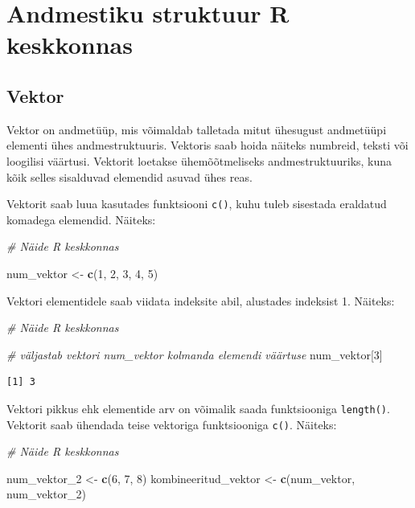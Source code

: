 \documentclass[
]{book}
\newenvironment{Shaded}{\begin{snugshade}}{\end{snugshade}}
\newcommand{\CommentTok}[1]{\textcolor[rgb]{0.56,0.35,0.01}{\textit{#1}}}
\newcommand{\DecValTok}[1]{\textcolor[rgb]{0.00,0.00,0.81}{#1}}
\newcommand{\FunctionTok}[1]{\textcolor[rgb]{0.13,0.29,0.53}{\textbf{#1}}}
\newcommand{\NormalTok}[1]{#1}
\newcommand{\OtherTok}[1]{\textcolor[rgb]{0.56,0.35,0.01}{#1}}
\renewenvironment{Shaded} {\begin{snugshade}\footnotesize} {\end{snugshade}}
\theoremstyle{definition}
\theoremstyle{definition}
\theoremstyle{definition}
\theoremstyle{definition}
\theoremstyle{remark}
\begin{document}
\section{Andmestiku struktuur R keskkonnas}\label{andmestiku-struktuur-r-keskkonnas}

\subsection{Vektor}\label{vektor}

Vektor on andmetüüp, mis võimaldab talletada mitut ühesugust andmetüüpi elementi ühes andmestruktuuris. Vektoris saab hoida näiteks numbreid, teksti või loogilisi väärtusi. Vektorit loetakse ühemõõtmeliseks andmestruktuuriks, kuna kõik selles sisalduvad elemendid asuvad ühes reas.

Vektorit saab luua kasutades funktsiooni \texttt{c()}, kuhu tuleb sisestada eraldatud komadega elemendid. Näiteks:

\begin{Shaded}
\begin{Highlighting}[]
\CommentTok{\# Näide R keskkonnas}

\NormalTok{num\_vektor }\OtherTok{\textless{}{-}} \FunctionTok{c}\NormalTok{(}\DecValTok{1}\NormalTok{, }\DecValTok{2}\NormalTok{, }\DecValTok{3}\NormalTok{, }\DecValTok{4}\NormalTok{, }\DecValTok{5}\NormalTok{)}
\end{Highlighting}
\end{Shaded}

Vektori elementidele saab viidata indeksite abil, alustades indeksist 1. Näiteks:

\begin{Shaded}
\begin{Highlighting}[]
\CommentTok{\# Näide R keskkonnas}

\CommentTok{\# väljastab vektori num\_vektor kolmanda elemendi väärtuse}
\NormalTok{num\_vektor[}\DecValTok{3}\NormalTok{] }
\end{Highlighting}
\end{Shaded}

\begin{verbatim}
[1] 3
\end{verbatim}

Vektori pikkus ehk elementide arv on võimalik saada funktsiooniga \texttt{length()}. Vektorit saab ühendada teise vektoriga funktsiooniga \texttt{c()}. Näiteks:

\begin{Shaded}
\begin{Highlighting}[]
\CommentTok{\# Näide R keskkonnas}

\NormalTok{num\_vektor\_2 }\OtherTok{\textless{}{-}} \FunctionTok{c}\NormalTok{(}\DecValTok{6}\NormalTok{, }\DecValTok{7}\NormalTok{, }\DecValTok{8}\NormalTok{)}
\NormalTok{kombineeritud\_vektor }\OtherTok{\textless{}{-}} \FunctionTok{c}\NormalTok{(num\_vektor, num\_vektor\_2)}
\end{Highlighting}
\end{Shaded}
\end{document}
